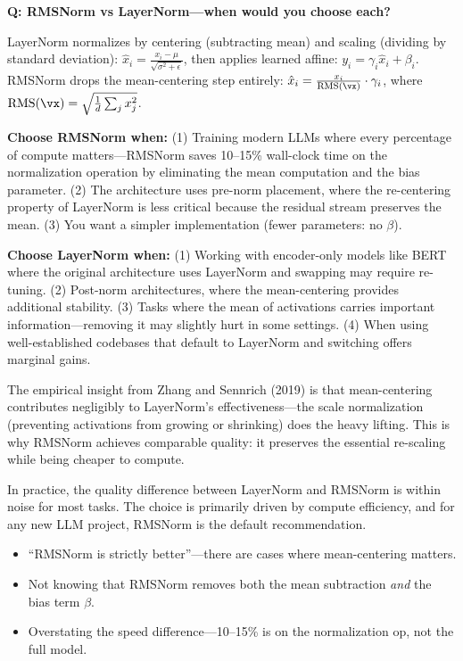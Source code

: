 \begin{interviewq}
\textbf{Q: RMSNorm vs LayerNorm---when would you choose each?}

 \quad {} \quad \badgefreq{\freqmed}

\stronganswer

LayerNorm normalizes by centering (subtracting mean) and scaling (dividing by standard deviation): $\hat{x}_i = \frac{x_i - \mu}{\sqrt{\sigma^2 + \epsilon}}$, then applies learned affine: $y_i = \gamma_i \hat{x}_i + \beta_i$. RMSNorm drops the mean-centering step entirely: $\hat{x}_i = \frac{x_i}{\text{RMS}(\vx)} \cdot \gamma_i$, where $\text{RMS}(\vx) = \sqrt{\frac{1}{d}\sum_j x_j^2}$.

\textbf{Choose RMSNorm when:} (1) Training modern LLMs where every percentage of compute matters---RMSNorm saves 10--15\% wall-clock time on the normalization operation by eliminating the mean computation and the bias parameter. (2) The architecture uses pre-norm placement, where the re-centering property of LayerNorm is less critical because the residual stream preserves the mean. (3) You want a simpler implementation (fewer parameters: no $\beta$).

\textbf{Choose LayerNorm when:} (1) Working with encoder-only models like BERT where the original architecture uses LayerNorm and swapping may require re-tuning. (2) Post-norm architectures, where the mean-centering provides additional stability. (3) Tasks where the mean of activations carries important information---removing it may slightly hurt in some settings. (4) When using well-established codebases that default to LayerNorm and switching offers marginal gains.

The empirical insight from Zhang and Sennrich (2019) is that mean-centering contributes negligibly to LayerNorm's effectiveness---the scale normalization (preventing activations from growing or shrinking) does the heavy lifting. This is why RMSNorm achieves comparable quality: it preserves the essential re-scaling while being cheaper to compute.

In practice, the quality difference between LayerNorm and RMSNorm is within noise for most tasks. The choice is primarily driven by compute efficiency, and for any new LLM project, RMSNorm is the default recommendation.

\redflags
\begin{itemize}
    \item ``RMSNorm is strictly better''---there are cases where mean-centering matters.
    \item Not knowing that RMSNorm removes both the mean subtraction \textit{and} the bias term $\beta$.
    \item Overstating the speed difference---10--15\% is on the normalization op, not the full model.
\end{itemize}


\end{interviewq}
